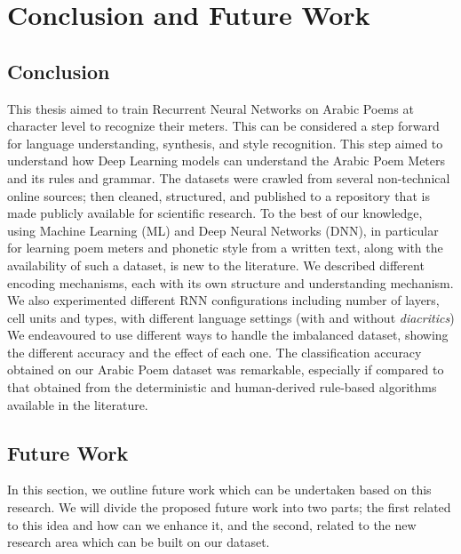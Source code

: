\chapter{Conclusion and Future Work}\label{cha:concl-future-work}



\section{Conclusion}\label{sec:conclusion}

This thesis aimed to train Recurrent Neural Networks on Arabic Poems at character level to recognize their meters. This can be considered a step forward for language understanding, synthesis, and style recognition. This step aimed to understand how Deep Learning models can understand the Arabic Poem Meters and its rules and grammar. The datasets were crawled from several non-technical online sources; then cleaned, structured, and published to a repository that is made publicly available for scientific research. To the best of our knowledge, using Machine Learning (ML) and Deep Neural Networks (DNN), in particular for learning poem meters and phonetic style from a written text, along with the availability of such a dataset, is new to the literature. We described different encoding mechanisms, each with its own structure and understanding mechanism. We also experimented different RNN configurations including number of layers, cell units and types, with different language settings (with and without \textit{diacritics}) We endeavoured to use different ways to handle the imbalanced dataset, showing the different accuracy and the effect of each one. The classification accuracy obtained on our Arabic Poem dataset was remarkable, especially if compared to that obtained from the deterministic and human-derived rule-based algorithms available in the literature.

\clearpage

\section{Future Work}

In this section, we outline future work which can be undertaken based on this research. We will divide the proposed future work into two parts; the first related to this idea and how can we enhance it, and the second, related to the new research area which can be built on our dataset.

